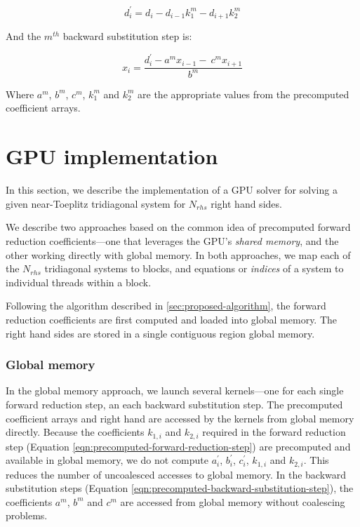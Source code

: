 \documentclass{elsarticle}
\begin{document}
\begin{equation}
d^{\prime}_i = d_i - d_{i-1}k_1^{m}  - d_{i+1}k_2^{m}
\label{eqn:precomputed-forward-reduction-step}
\end{equation}

And the $m^{th}$ backward substitution step is:

\begin{equation}
x_i = \frac{d^{\prime}_i - a^mx_{i-1} - \
    c^{m}x_{i+1}}{b^m}
\label{eqn:precomputed-backward-substitution-step}
\end{equation}

Where $a^m$, $b^m$, $c^m$, $k_1^m$ and $k_2^m$
are the appropriate values
from the precomputed coefficient arrays.

\section{GPU implementation} \label{sec:gpu-implementation}

In this section, we describe the implementation of a GPU solver
for solving a given near-Toeplitz tridiagonal system
for $N_{rhs}$ right hand sides.

We describe two approaches based on the common idea
of precomputed forward reduction coefficients---one that leverages
the GPU's \emph{shared memory},
and the other working directly with global memory.
In both approaches,
we map each of the $N_{rhs}$ tridiagonal systems
to blocks,
and equations or \emph{indices} of a system
to individual threads within a block.

Following the algorithm described in \ref{sec:proposed-algorithm},
the forward reduction coefficients
are first computed and loaded into global memory.
The right hand sides are stored in a single
contiguous region global memory.

\subsubsection*{Global memory}

In the global memory approach,
we launch several kernels---one
for each single forward reduction step,
an each backward substitution step.
The precomputed coefficient arrays and right hand
are accessed by the kernels from global memory directly.
Because the coefficients
$k_{1,i}$ and $k_{2,i}$
required in the forward reduction step
(Equation \ref{eqn:precomputed-forward-reduction-step})
are precomputed and available in global memory,
we do not compute
$a_i^\prime$, $b_i^\prime$, $c_i^\prime$,
$k_{1,i}$ and $k_{2,i}$.
This reduces the number of uncoalesced accesses to global memory.
In the backward substitution steps
(Equation \ref{eqn:precomputed-backward-substitution-step}),
the coefficients $a^m$, $b^m$ and $c^m$
are accessed from global memory without coalescing problems.
\end{document}

